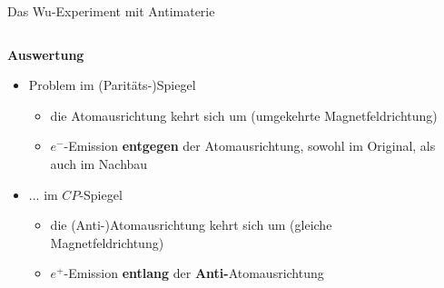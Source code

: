 \begin{frame}{Das Wu-Experiment mit Antimaterie}
    \begin{columns}[T]
        \begin{column}{.6\textwidth}
            \textbf{Auswertung}
            \begin{itemize}
                \item Problem im (Parit\"ats-)Spiegel
                \begin{itemize}
                    \item die Atomausrichtung kehrt sich um (umgekehrte Magnetfeldrichtung)
                    \item $e^-$-Emission \textbf{entgegen} der Atomausrichtung, sowohl im Original, als auch im Nachbau
                \end{itemize}
                \item<2> ... im $C\!P$-Spiegel
                \begin{itemize}
                    \item<2> die (Anti-)Atomausrichtung kehrt sich um (gleiche Magnetfeldrichtung)
                    \item<2> $e^+$-Emission \textbf{entlang} der \textbf{Anti-}Atomausrichtung
                \end{itemize}
            \end{itemize}
        \end{column}
        \begin{column}{.4\textwidth}
            \centering
        \end{column}
    \end{columns}
\end{frame}

